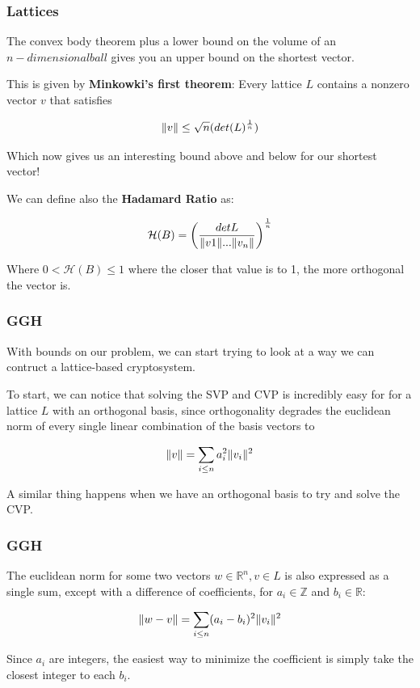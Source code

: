 \documentclass{beamer}
\DeclarePairedDelimiter{\norm}{\lVert}{\rVert}
\newcommand{\rat}{\mathbb{R}}
\newcommand{\zee}{\mathbb{Z}}
\begin{document}
\begin{frame}
\frametitle{Lattices}

The convex body theorem plus a lower bound on the volume of an $n-dimensional ball$ gives you an upper bound on the shortest vector.

This is given by \textbf{Minkowki's first theorem}: Every lattice $L$ contains a nonzero vector $v$ that satisfies 

\[ \norm{v} \leq \sqrt{n} (det(L)^{\frac{1}{n}}) \]

Which now gives us an interesting bound above and below for our shortest vector!

We can define also the \textbf{Hadamard Ratio} as:

\[ \mathcal{H}(B) = \bigg( \frac{det L}{\norm{v1}...\norm{v_n}} \bigg)^{\frac{1}{n}} \]

Where $0 < \mathcal{H}(B) \leq 1$ where the closer that value is to 1, the more orthogonal the vector is.

\end{frame}

\begin{frame}
\frametitle{GGH}

With bounds on our problem, we can start trying to look at a way we can contruct a lattice-based cryptosystem.

To start, we can notice that solving the SVP and CVP is incredibly easy for for a lattice $L$ with an orthogonal basis, since orthogonality degrades the euclidean norm of every single linear combination of the basis vectors to

\[ \norm{v} = \sum_{i \leq n} a_i^2 \norm{v_i}^2 \]

A similar thing happens when we have an orthogonal basis to try and solve the CVP.

\end{frame}

\begin{frame}
\frametitle{GGH}


The euclidean norm for some two vectors $w \in \rat^n, v \in L$ is also expressed as a single sum, except with a difference of coefficients, for $a_i \in \zee$ and $b_i \in \rat$:

\[ \norm{w-v} = \sum_{i \leq n} (a_i - b_i)^2 \norm{v_i}^2  \]

Since $a_i$ are integers, the easiest way to minimize the coefficient is simply take the closest integer to each $b_i$.

\end{frame}
\end{document}
